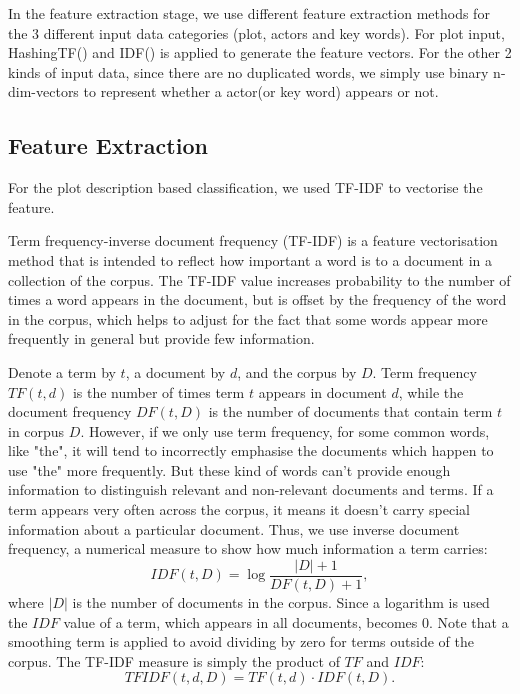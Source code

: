 \documentclass{vldb}
\begin{document}
\par In the feature extraction stage, we use different feature extraction methods for the 3 different input data categories (plot, actors and key words). For plot input, HashingTF() and IDF() is applied to generate the feature vectors. For the other 2 kinds of input data, since there are no duplicated words, we simply use binary n-dim-vectors to represent whether a actor(or key word) appears or not.


\subsection{Feature Extraction}
\par For the plot description based classification, we used TF-IDF\cite{mining} to vectorise the feature.
\par Term frequency-inverse document frequency (TF-IDF) is a feature vectorisation method that is intended to reflect how important a word is to a document in a collection of the corpus. The TF-IDF value increases probability to the number of times a word appears in the document, but is offset by the frequency of the word in the corpus, which helps to adjust for the fact that some words appear more frequently in general but provide few information.
\par Denote a term by $t$, a document by $d$, and the corpus by $D$. Term frequency $TF(t,d)$ is the number of times term $t$ appears in document $d$, while the document frequency $DF(t,D)$ is the number of documents that contain term $t$ in corpus $D$. However, if we only use term frequency, for some common words, like "the", it will tend to incorrectly emphasise the documents which happen to use "the" more frequently. But these kind of words can't provide enough information to distinguish relevant and non-relevant documents and terms. If a term appears very often across the corpus, it means it doesn't carry special information about a particular document. Thus, we use inverse document frequency, a numerical measure to show how much information a term carries:
\begin{displaymath}
IDF(t,D) = \log\frac{|D|+1}{DF(t,D)+1},
\end{displaymath}
where $|D|$ is the number of documents in the corpus. Since a logarithm is used the $IDF$ value of a term, which appears in all documents, becomes 0. Note that a smoothing term is applied to avoid dividing by zero for terms outside of the corpus. The TF-IDF measure is simply the product of $TF$ and $IDF$:
\begin{displaymath}
TFIDF(t,d,D)=TF(t,d)⋅IDF(t,D).
\end{displaymath} 
\end{document}
